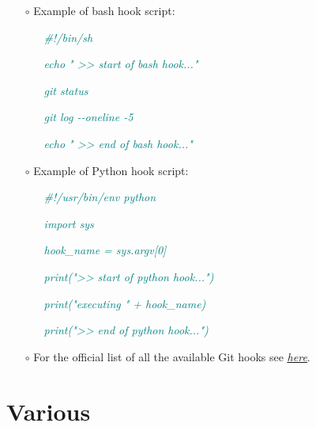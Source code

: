 \documentclass[a4paper,portrait,10pt]{article}   %
\newcommand{\mybulletlvA}{$\circ$}   %
\newcommand{\myparvspace}{\vspace{4mm}}   %
\newcommand{\mysecvspace}{\vspace{6mm}}   %
\newcommand{\myurl}[2]{\href{{#1}}{\underline{\textit{#2}}}}   %
\newcommand{\mytextfilecolor}{teal}   %
\begin{document}
\begin{itemize}
\item[\mybulletlvA] Example of bash hook script:
\begin{itemize}
  \item[] \textcolor{\mytextfilecolor}{\textit{\#!/bin/sh}}
  \item[] \textcolor{\mytextfilecolor}{\textit{echo " >{}> start of bash hook..."}}
  \item[] \textcolor{\mytextfilecolor}{\textit{git status}}
  \item[] \textcolor{\mytextfilecolor}{\textit{git log -{}-oneline -5}}
  \item[] \textcolor{\mytextfilecolor}{\textit{echo " >{}> end of bash hook..."}}
\end{itemize}
\myparvspace

\item[\mybulletlvA] Example of Python hook script:
\begin{itemize}
  \item[] \textcolor{\mytextfilecolor}{\textit{\#!/usr/bin/env python}}
  \item[] \textcolor{\mytextfilecolor}{\textit{import sys}}
  \item[] \textcolor{\mytextfilecolor}{\textit{hook\_name = sys.argv[0]}}
  \item[] \textcolor{\mytextfilecolor}{\textit{print(">{}> start of python hook...")}}
  \item[] \textcolor{\mytextfilecolor}{\textit{print("executing " + hook\_name)}}
  \item[] \textcolor{\mytextfilecolor}{\textit{print(">{}> end of python hook...")}}
\end{itemize}
\myparvspace

\item[\mybulletlvA] For the official list of all the available Git hooks see \myurl{https://git-scm.com/docs/githooks}{here}.
\end{itemize}
\mysecvspace


\section{Various}   \label{sec:Various}
\end{document}
